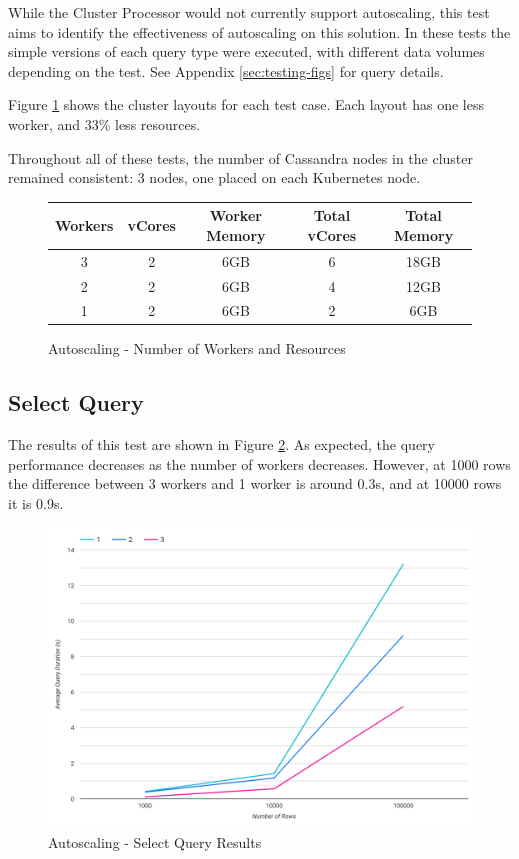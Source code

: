 While the Cluster Processor would not currently support autoscaling, this test aims to identify the effectiveness of autoscaling on this solution. In these tests the simple versions of each query type were executed, with different data volumes depending on the test. See Appendix \ref{sec:testing-figs} for query details. 

Figure \ref{fig:autoscale-test-workers} shows the cluster layouts for each test case. Each layout has one less worker, and 33\% less resources.

Throughout all of these tests, the number of Cassandra nodes in the cluster remained consistent: 3 nodes, one placed on each Kubernetes node.

\begin{figure}[ht]
	\centering
	\begin{tabular}{| c | c | c | c | c |}
		\hline
		\textbf{Workers} & \textbf{vCores} & \textbf{Worker Memory} & \textbf{Total vCores} & \textbf{Total Memory} \\ \hline
		3 & 2 & 6GB & 6 & 18GB \\ \hline
		2 & 2 & 6GB & 4 & 12GB \\ \hline
		1 & 2 & 6GB & 2 & 6GB \\ \hline
	\end{tabular}
	\caption{Autoscaling - Number of Workers and Resources}
	\label{fig:autoscale-test-workers}
\end{figure}

\subsection{Select Query}
The results of this test are shown in Figure \ref{fig:select-simple-autoscale-test}. As expected, the query performance decreases as the number of workers decreases. However, at 1000 rows the difference between 3 workers and 1 worker is around 0.3s, and at 10000 rows it is 0.9s.

\begin{figure}[ht]
	\centering
	\includegraphics[width=0.7\linewidth]{chapters/diagrams/testing/select-simple-autoscale-test}
	\caption{Autoscaling - Select Query Results}
	\label{fig:select-simple-autoscale-test}
\end{figure}

